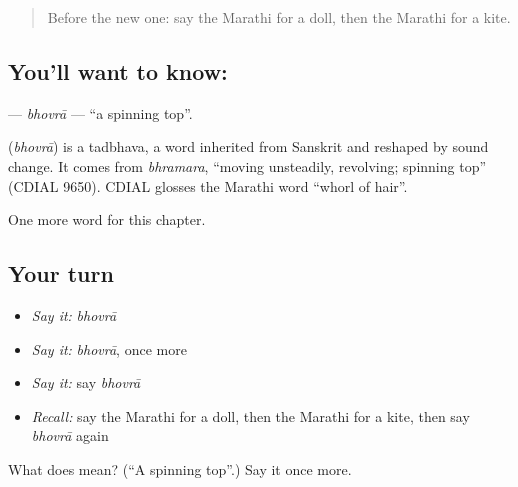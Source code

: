 \label{lesson:MR-C249-bhovra}



\begin{quote}
Before the new one: say the Marathi for a doll, then the Marathi for a kite.
\end{quote}

\subsection*{You'll want to know: }
\textbf{} — \emph{bhovrā} — \textquotedblleft{}a spinning top\textquotedblright{}.

\begin{cousinweb}
\textbf{} (\emph{bhovrā}) is a tadbhava, a word inherited from Sanskrit and reshaped by sound change. It comes from \emph{bhramara}, \textquotedblleft{}moving unsteadily, revolving; spinning top\textquotedblright{} (CDIAL 9650). CDIAL glosses the Marathi word \textquotedblleft{}whorl of hair\textquotedblright{}.
\end{cousinweb}

\begin{grammarlens}[title={What you've built}]
One more word for this chapter.
\end{grammarlens}

\subsection*{Your turn}
\begin{itemize}
\raggedright
  \item \emph{Say it:} \emph{bhovrā}
  \item \emph{Say it:} \emph{bhovrā}, once more
  \item \emph{Say it:} say \emph{bhovrā}
  \item \emph{Recall:} say the Marathi for a doll, then the Marathi for a kite, then say \emph{bhovrā} again
\end{itemize}

\begin{tcolorbox}[breakable,colback=teal!4,colframe=teal!35!black,title={Before you move on}]
What does  mean? (\textquotedblleft{}A spinning top\textquotedblright{}.) Say it once more.
\end{tcolorbox}
